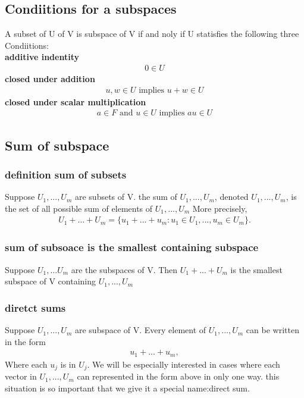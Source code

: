 \documentclass[a4paper,12pt]{article}
\begin{document}
    \subsection{\textbf{\color{cyan} Condiitions for a subspaces}}
    A subset of U of V is subspace of V if and noly if U statisfies the following three Condiitions:\\
    \textbf{additive indentity}
    \begin{align*}
        0 \in U
    \end{align*}
    \textbf{closed under addition}
    \begin{align*}
        u,w \in U \text{ implies } u + w \in U
    \end{align*}
    \textbf{closed under scalar multiplication}
    \begin{align*}
        a \in F \text{ and } u \in U \text{ implies } au \in U
    \end{align*}
    \subsection{\textbf{\color{cyan} Sum of subspace}}
        \subsubsection{definition \textbf{sum of subsets}}
        Suppose $U_1,...,U_m$ are subsets of V. the sum of $U_1,...,U_m$, denoted $U_1,...,U_m$, is the set of all possible sum of elements
        of $U_1,...,U_m$ More precisely,
        \begin{align*}
            U_1 + ... + U_m = \{u_1 + ... + u_m : u_1\in U_1,..., u_m \in U_m\}.
        \end{align*}
        \subsubsection{\textbf{\color{cyan} sum of subsoace is the smallest containing subspace}}
        Suppose $U_1,...U_m$ are the subspaces of V. Then $U_1 + ... + U_m$ is the smallest subspace of V containing $U_1,...,U_m$ 
        \subsubsection{\textbf{\color{cyan} diretct sums}}
        Suppose $U_1,...,U_m$ are subspace of V. Every element of $U_1,...,U_m$ can be written in the form
        \begin{align*}
            u_1 + ... + u_m,
        \end{align*}
        Where each $u_j$ is in $U_j$. We will be especially interested in cases where each vector in $U_1,...,U_m$ can represented in the form above
        in only one way. this situation is so important that we give it a special name:direct sum.  
\end{document}
